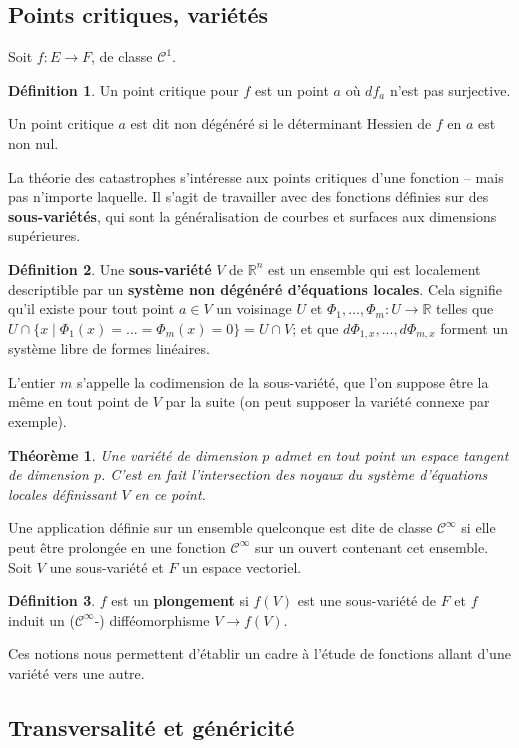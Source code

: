 \documentclass{article}
\newcommand{\cun}{\mathcal{C}^1}
\newcommand{\cinf}{\mathcal{C}^\infty}
\newcommand{\R}{\mathbb{R}}
\newtheorem{thm}{Théorème}
\theoremstyle{definition}
\newtheorem{defn}{Définition}
\begin{document}
\subsection{Points critiques, variétés}

Soit $f:E\to F$, de classe $\cun$.
\begin{defn}
	Un point critique pour $f$ est un point $a$ où $df_a$ n'est pas surjective.

	Un point critique $a$ est dit non dégénéré si le déterminant Hessien de $f$ en $a$ est non nul.
\end{defn}

La théorie des catastrophes s'intéresse aux points critiques d'une fonction -- mais pas n'importe laquelle.
Il s'agit de travailler avec des fonctions définies sur des \textbf{sous-variétés}, qui sont la généralisation de courbes et surfaces aux dimensions supérieures.
\begin{defn}
	Une \textbf{sous-variété} $V$ de $\R^n$ est un ensemble qui est localement descriptible par un \textbf{système non dégénéré d'équations locales}.
	Cela signifie qu'il existe pour tout point $a\in V$ un voisinage $U$ et $\Phi_1,...,\Phi_m: U \to\R$ telles que $U\cap\{x\mid \Phi_1(x)=...=\Phi_m(x)=0\}=U\cap V$; et que $d\Phi_{1,x},...,d\Phi_{m,x}$ forment un système libre de formes linéaires.

	L'entier $m$ s'appelle la codimension de la sous-variété, que l'on suppose être la même en tout point de $V$ par la suite (on peut supposer la variété connexe par exemple).
\end{defn}
\begin{thm}
	Une variété de dimension $p$ admet en tout point un espace tangent de dimension $p$.
	C'est en fait l'intersection des noyaux du système d'équations locales définissant $V$ en ce point.
\end{thm}

Une application définie sur un ensemble quelconque est dite de classe $\cinf$ si elle peut être prolongée en une fonction $\cinf$ sur un ouvert contenant cet ensemble. Soit $V$ une sous-variété et $F$ un espace vectoriel.
\begin{defn}
	$f$ est un \textbf{plongement} si $f(V)$ est une sous-variété de $F$ et $f$ induit un ($\cinf$-) difféomorphisme $V\to f(V)$.
\end{defn}

Ces notions nous permettent d'établir un cadre à l'étude de fonctions allant d'une variété vers une autre.

\subsection{Transversalité et généricité}
\end{document}

